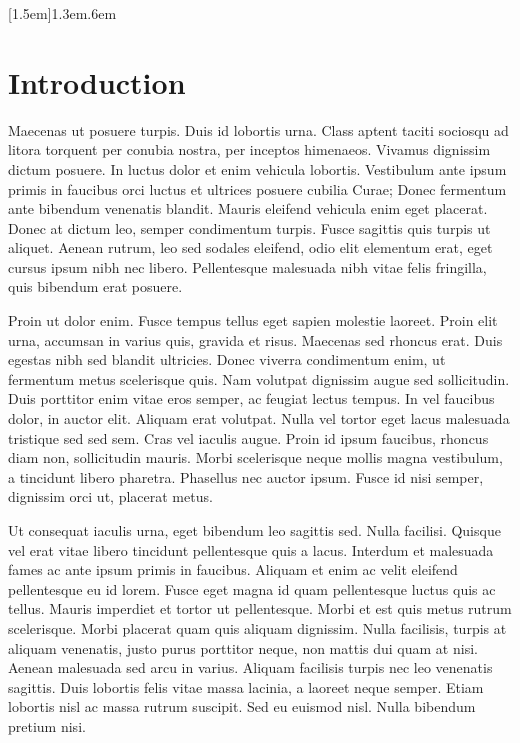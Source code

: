 \documentclass[pdftex,12pt,a4paper]{article}
\begin{document}
\newpage
{}[1.5em]{\bfseries}{1.3em}{.6em}

\tableofcontents


\newpage
\listoffigures

\newpage
\listoftables

\clearpage
{}

\pagebreak
\section{Introduction}

\setlength{\parskip}{1em}

 Maecenas ut posuere turpis. Duis id lobortis urna. Class aptent taciti sociosqu ad litora torquent per conubia nostra, per inceptos himenaeos. Vivamus dignissim dictum posuere. In luctus dolor et enim vehicula lobortis. Vestibulum ante ipsum primis in faucibus orci luctus et ultrices posuere cubilia Curae; Donec fermentum ante bibendum venenatis blandit. Mauris eleifend vehicula enim eget placerat. Donec at dictum leo, semper condimentum turpis. Fusce sagittis quis turpis ut aliquet. Aenean rutrum, leo sed sodales eleifend, odio elit elementum erat, eget cursus ipsum nibh nec libero. Pellentesque malesuada nibh vitae felis fringilla, quis bibendum erat posuere.

Proin ut dolor enim. Fusce tempus tellus eget sapien molestie laoreet. Proin elit urna, accumsan in varius quis, gravida et risus. Maecenas sed rhoncus erat. Duis egestas nibh sed blandit ultricies. Donec viverra condimentum enim, ut fermentum metus scelerisque quis. Nam volutpat dignissim augue sed sollicitudin. Duis porttitor enim vitae eros semper, ac feugiat lectus tempus. In vel faucibus dolor, in auctor elit. Aliquam erat volutpat. Nulla vel tortor eget lacus malesuada tristique sed sed sem. Cras vel iaculis augue. Proin id ipsum faucibus, rhoncus diam non, sollicitudin mauris. Morbi scelerisque neque mollis magna vestibulum, a tincidunt libero pharetra. Phasellus nec auctor ipsum. Fusce id nisi semper, dignissim orci ut, placerat metus.

Ut consequat iaculis urna, eget bibendum leo sagittis sed. Nulla facilisi. Quisque vel erat vitae libero tincidunt pellentesque quis a lacus. Interdum et malesuada fames ac ante ipsum primis in faucibus. Aliquam et enim ac velit eleifend pellentesque eu id lorem. Fusce eget magna id quam pellentesque luctus quis ac tellus. Mauris imperdiet et tortor ut pellentesque. Morbi et est quis metus rutrum scelerisque. Morbi placerat quam quis aliquam dignissim. Nulla facilisis, turpis at aliquam venenatis, justo purus porttitor neque, non mattis dui quam at nisi. Aenean malesuada sed arcu in varius. Aliquam facilisis turpis nec leo venenatis sagittis. Duis lobortis felis vitae massa lacinia, a laoreet neque semper. Etiam lobortis nisl ac massa rutrum suscipit. Sed eu euismod nisl. Nulla bibendum pretium nisi. 
\end{document}
